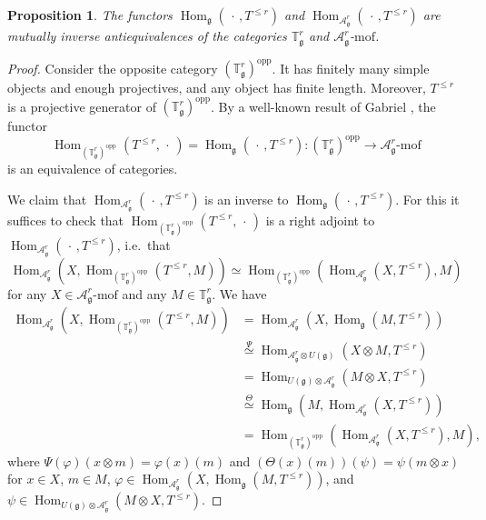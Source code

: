 \documentclass{amsart}
\newcommand{\Tg}{\mathbb T_{\mathfrak g}}
\renewcommand{\gg}{\mathfrak{g}}
\newtheorem{prop}[thm]{Proposition}
\theoremstyle{definition}
\numberwithin{equation}{section}
\begin{document}
\begin{prop}\label{equiv} 
The functors
  $\operatorname{Hom}_\gg(\, \cdot \,, T^{\leq r})$ and
  $\operatorname{Hom}_{\mathcal A_\gg^r}(\, \cdot \,, T^{\leq r})$ are mutually inverse
  antiequivalences of the categories  $\Tg^r$ and $\mathcal{A}_\gg^r$-$\mathrm{mof}$. 
\end{prop}
\begin{proof}
Consider the opposite category $(\Tg^r)^\mathrm{opp}$.  It has finitely many simple objects and enough projectives, and any object has finite length.  Moreover, $T^{\leq r}$ is a projective generator of $(\Tg^r)^\mathrm{opp}$.  By a well-known result of Gabriel \cite{G}, 
the functor
$$\operatorname{Hom}_{(\Tg^r)^\mathrm{opp}} (T^{\leq r}, \, \cdot \,) = \operatorname{Hom}_\gg (\, \cdot \,, T^{\leq r}) : (\Tg^r)^\mathrm{opp} \rightarrow \mathcal{A}_\gg^r \textrm{-mof}$$
is an equivalence of categories. 

We claim that $\operatorname{Hom}_{\mathcal{A}_\gg^r} (\, \cdot \,, T^{\leq r})$ is an inverse to $\operatorname{Hom}_\gg (\, \cdot \,, T^{\leq r})$.  For this it suffices to check that $\operatorname{Hom}_{(\Tg^r)^\mathrm{opp}} (T^{\leq r}, \, \cdot \,)$ is a right adjoint to $\operatorname{Hom}_{\mathcal{A}_\gg^r} (\, \cdot \,, T^{\leq r})$, i.e.\ that 
\begin{equation*} 
\operatorname{Hom}_{\mathcal{A}_\gg^r} (X, \operatorname{Hom}_{(\Tg^r)^\mathrm{opp}} (T^{\leq r}, M)) \simeq \operatorname{Hom}_{(\Tg^r)^\mathrm{opp}} (\operatorname{Hom}_{\mathcal{A}_\gg^r} (X, T^{\leq r}),M)
\end{equation*}
for any $X \in \mathcal{A}_\gg^r \textrm{-mof}$ and any $M \in \Tg^r$.  We have 
\begin{align*}
\operatorname{Hom}_{\mathcal{A}_\gg^r} (X, \operatorname{Hom}_{(\Tg^r)^\mathrm{opp}} (T^{\leq r}, M))
& = \operatorname{Hom}_{\mathcal{A}_\gg^r} (X, \operatorname{Hom}_\gg (M, T^{\leq r})) \\
& \stackrel{\Psi}{\simeq}  \operatorname{Hom}_{\mathcal{A}_\gg^r \otimes U (\gg) } (X \otimes M, T^{\leq r}) \\
& = \operatorname{Hom}_{U (\gg) \otimes \mathcal{A}_\gg^r } (M \otimes X, T^{\leq r}) \\
&  \stackrel{\Theta}{\simeq} \operatorname{Hom}_\gg (M , \operatorname{Hom}_{\mathcal{A}_\gg^r} (X, T^{\leq r}))\\
& = \operatorname{Hom}_{(\Tg^r)^\mathrm{opp}} (\operatorname{Hom}_{\mathcal{A}_\gg^r} (X, T^{\leq r}),M),
\end{align*}
where $\Psi(\varphi) (x \otimes m) = \varphi (x) (m)$ and $(\Theta (x) (m))(\psi) = \psi(m \otimes x)$ for $x \in X$, $m \in M$, $\varphi \in  \operatorname{Hom}_{\mathcal{A}_\gg^r} (X, \operatorname{Hom}_\gg (M, T^{\leq r}))$, and $\psi \in  \operatorname{Hom}_{U (\gg) \otimes \mathcal{A}_\gg^r } (M \otimes X, T^{\leq r})$.
\end{proof}
\end{document}
